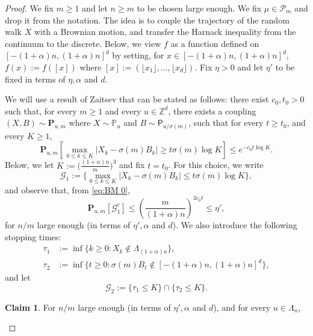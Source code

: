 \documentclass[11pt,a4paper]{article}
\numberwithin{equation}{section}
\theoremstyle{plain}
\theoremstyle{definition}
\newtheorem{Claim}[Thm]{Claim}
\begin{document}
\begin{proof} We fix $m\geq 1$ and let $n\geq m$ to be chosen large enough. We fix $\mu \in \mathcal P_m$ and drop it from the notation. The idea is to couple the trajectory of the random walk $X$ with a Brownian motion, and transfer the Harnack inequality from the continuum to the discrete. Below, we view $f$ as a function defined on  $[-(1+\alpha)n,(1+\alpha)n]^d$ by setting, for $x\in [-(1+\alpha)n,(1+\alpha)n]^d$, $f(x):=f([x])$ where $[x]:=(\lfloor x_1\rfloor,\ldots,\lfloor x_d\rfloor)$. Fix $\eta>0$ and let $\eta'$ to be fixed in terms of $\eta, \alpha$ and $d$.

We will use a result of Zaitsev \cite{zaitsev1998multidimensional} that can be stated as follows: there exist $c_0,t_0>0$ such that, for every $m\geq 1$ and every $u\in \mathbb Z^d$, there exists a coupling $(X,B)\sim \mathbf P_{u,m}$ where $X\sim \mathbb P_u$ and $B\sim \mathsf{P}_{u/\sigma(m)}$, such that for every $t\geq t_0$, and every $K\geq 1$,
\begin{equation}\label{eq:BM 0}
	\mathbf P_{u,m}\left[\max_{0\leq k \leq K}|X_k-\sigma(m)B_k|\geq t\sigma(m)\log K\right]\leq e^{-c_0 t \log K}.
\end{equation}
Below, we let $K:=\Big(\tfrac{(1+\alpha)n}{m}\Big)^3$ and fix $t=t_0$. For this choice, we write
\begin{equation}
	\mathcal G_1:=\Big\{\max_{0\leq k \leq K}|X_k-\sigma(m)B_k|\leq t\sigma(m)\log K\Big\},
\end{equation}
and observe that, from \eqref{eq:BM 0},
\begin{equation}\label{eq:BM 1}
	\mathbf P_{u,m}[\mathcal G_1^c]\leq \left(\frac{m}{(1+\alpha)n}\right)^{3c_0t}\leq \eta',
\end{equation}
for $n/m$ large enough (in terms of $\eta',\alpha$ and $d$).
We also introduce the following stopping times:
\begin{align}
	\tau_1&:=\inf\{k\geq 0: X_k\notin \Lambda_{(1+\alpha)n}\},
	\\\tau_2&:=\inf\{t\geq 0: \sigma(m)B_t\notin [-(1+\alpha)n,(1+\alpha)n]^d\},
\end{align}
and let
\begin{equation}
	\mathcal G_2:=\{\tau_1\leq K\}\cap \{\tau_2\leq K\}.
\end{equation}
\begin{Claim}\label{claim1} For $n/m$ large enough (in terms of $\eta',\alpha$ and $d$), and for every $u \in \Lambda_n$, \begin{equation}\label{eq:BM 2}

\end{equation}
\end{Claim}
\end{proof}
\end{document}
